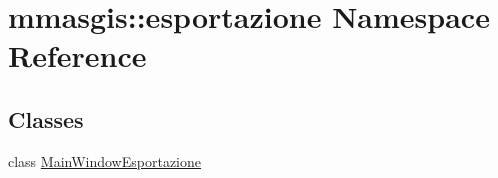 \hypertarget{namespacemmasgis_1_1esportazione}{
\section{mmasgis::esportazione Namespace Reference}
\label{namespacemmasgis_1_1esportazione}
}
\subsection*{Classes}
\begin{DoxyCompactItemize}
\item 
class \hyperlink{classmmasgis_1_1esportazione_1_1MainWindowEsportazione}{MainWindowEsportazione}
\end{DoxyCompactItemize}
